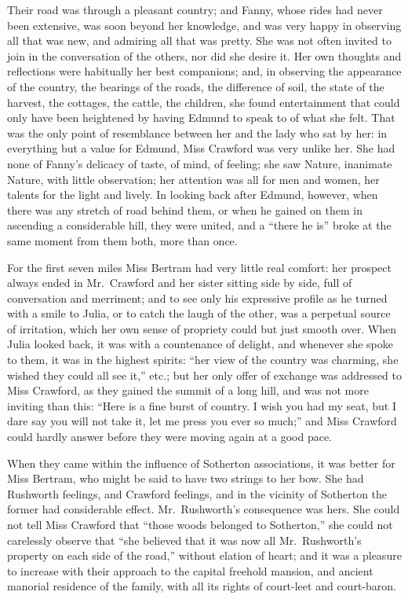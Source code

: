 Their road was through a pleasant country; and Fanny,
whose rides had never been extensive, was soon beyond
her knowledge, and was very happy in observing all that
was new, and admiring all that was pretty.  She was not
often invited to join in the conversation of the others,
nor did she desire it.  Her own thoughts and reflections
were habitually her best companions; and, in observing
the appearance of the country, the bearings of the roads,
the difference of soil, the state of the harvest, the cottages,
the cattle, the children, she found entertainment
that could only have been heightened by having Edmund
to speak to of what she felt.  That was the only point
of resemblance between her and the lady who sat by her:
in everything but a value for Edmund, Miss Crawford was
very unlike her.  She had none of Fanny's delicacy of taste,
of mind, of feeling; she saw Nature, inanimate Nature,
with little observation; her attention was all for men
and women, her talents for the light and lively.
In looking back after Edmund, however, when there was
any stretch of road behind them, or when he gained on
them in ascending a considerable hill, they were united,
and a ``there he is'' broke at the same moment from them both,
more than once.

For the first seven miles Miss Bertram had very little
real comfort:  her prospect always ended in Mr.\ Crawford
and her sister sitting side by side, full of conversation
and merriment; and to see only his expressive profile
as he turned with a smile to Julia, or to catch the laugh
of the other, was a perpetual source of irritation,
which her own sense of propriety could but just smooth over.
When Julia looked back, it was with a countenance of delight,
and whenever she spoke to them, it was in the highest spirits:
``her view of the country was charming, she wished they
could all see it,'' etc.; but her only offer of exchange
was addressed to Miss Crawford, as they gained the summit
of a long hill, and was not more inviting than this:
``Here is a fine burst of country.  I wish you had my seat,
but I dare say you will not take it, let me press you ever
so much;'' and Miss Crawford could hardly answer before they
were moving again at a good pace.

When they came within the influence of Sotherton associations,
it was better for Miss Bertram, who might be said to have
two strings to her bow.  She had Rushworth feelings,
and Crawford feelings, and in the vicinity of Sotherton
the former had considerable effect.  Mr.\ Rushworth's
consequence was hers.  She could not tell Miss Crawford
that ``those woods belonged to Sotherton,'' she could not
carelessly observe that ``she believed that it was now
all Mr.\ Rushworth's property on each side of the road,''
without elation of heart; and it was a pleasure to increase
with their approach to the capital freehold mansion,
and ancient manorial residence of the family, with all
its rights of court-leet and court-baron.

